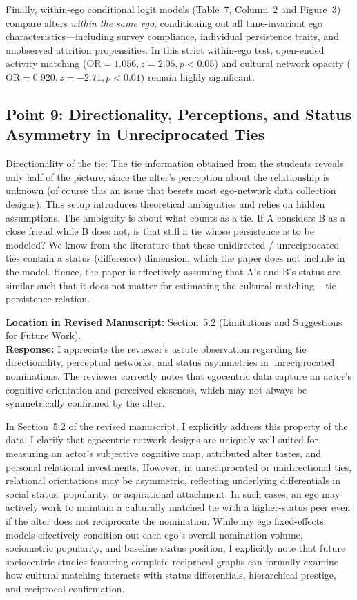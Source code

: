 \documentclass[11pt]{article}
\begin{document}
Finally, within-ego conditional logit models (Table~7, Column~2 and Figure~3) compare alters \textit{within the same ego}, conditioning out all time-invariant ego characteristics—including survey compliance, individual persistence traits, and unobserved attrition propensities. In this strict within-ego test, open-ended activity matching ($\text{OR} = 1.056, z = 2.05, p < 0.05$) and cultural network opacity ($\text{OR} = 0.920, z = -2.71, p < 0.01$) remain highly significant. 

\subsection*{Point 9: Directionality, Perceptions, and Status Asymmetry in Unreciprocated Ties}

\begin{reviewercomment}
Directionality of the tie: The tie information obtained from the students reveals only half of the picture, since the alter's perception about the relationship is unknown (of course this an issue that besets most ego-network data collection designs). This setup introduces theoretical ambiguities and relies on hidden assumptions. The ambiguity is about what counts as a tie. If A considers B as a close friend while B does not, is that still a tie whose persistence is to be modeled? We know from the literature that these unidirected / unreciprocated ties contain a status (difference) dimension, which the paper does not include in the model. Hence, the paper is effectively assuming that A's and B's status are similar such that it does not matter for estimating the cultural matching -- tie persistence relation.
\end{reviewercomment}

\noindent\textbf{Location in Revised Manuscript:} Section~5.2 (Limitations and Suggestions for Future Work).\\[4pt]
\textbf{Response:} I appreciate the reviewer's astute observation regarding tie directionality, perceptual networks, and status asymmetries in unreciprocated nominations. The reviewer correctly notes that egocentric data capture an actor's cognitive orientation and perceived closeness, which may not always be symmetrically confirmed by the alter.

In Section~5.2 of the revised manuscript, I explicitly address this property of the data. I clarify that egocentric network designs are uniquely well-suited for measuring an actor's subjective cognitive map, attributed alter tastes, and personal relational investments. However, in unreciprocated or unidirectional ties, relational orientations may be asymmetric, reflecting underlying differentials in social status, popularity, or aspirational attachment. In such cases, an ego may actively work to maintain a culturally matched tie with a higher-status peer even if the alter does not reciprocate the nomination. While my ego fixed-effects models effectively condition out each ego's overall nomination volume, sociometric popularity, and baseline status position, I explicitly note that future sociocentric studies featuring complete reciprocal graphs can formally examine how cultural matching interacts with status differentials, hierarchical prestige, and reciprocal confirmation.
\end{document}
